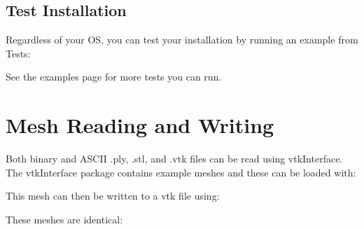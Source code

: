 \documentclass[letterpaper,10pt,english]{sphinxmanual}
\begin{document}
\subsection{Test Installation}
\label{\detokenize{installation:test-installation}}
Regardless of your OS, you can test your installation by running an example
from Tests:

\begin{sphinxVerbatim}[commandchars=\\\{\}]
   
\end{sphinxVerbatim}

See the examples page for more tests you can run.


\section{Mesh Reading and Writing}
\label{\detokenize{examples:examples-ref}}\label{\detokenize{examples:mesh-reading-and-writing}}\label{\detokenize{examples::doc}}
Both binary and ASCII .ply, .stl, and .vtk files can be read using
vtkInterface.  The vtkInterface package contains example meshes and these can
be loaded with:

\begin{sphinxVerbatim}[commandchars=\\\{\}]
 

   
  

  
\end{sphinxVerbatim}

This mesh can then be written to a vtk file using:

\begin{sphinxVerbatim}[commandchars=\\\{\}]
\end{sphinxVerbatim}

These meshes are identical:

\begin{sphinxVerbatim}[commandchars=\\\{\}]
  

   
 
\end{sphinxVerbatim}
\end{document}
